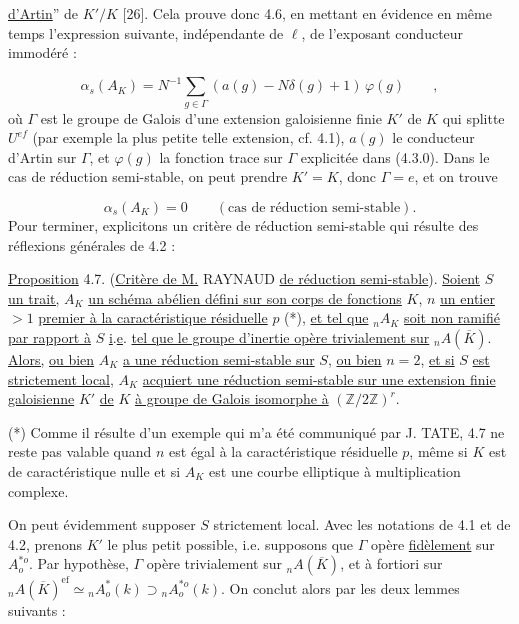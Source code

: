
\underline{d'Artin}'' de $K'/K$ [26]. Cela prouve donc 4.6, en mettant en évidence en même temps l'expression suivante, indépendante de $\ell$, de l'exposant conducteur immodéré :

\begin{equation}\tag{4.6.2}
\alpha_s(A_K) = N^{-1} \sum_{g \in \Gamma} (a(g)-N\delta(g)+1)\, \varphi(g) \qquad ,
\end{equation}
où $\Gamma$ est le groupe de Galois d'une extension galoisienne finie $K'$ de $K$ qui splitte $U^{ef}$ (par exemple la plus petite telle extension, cf. 4.1), $a(g)$ le conducteur d'Artin sur $\Gamma$, et $\varphi(g)$ la fonction trace sur $\Gamma$ explicitée dans (4.3.0). Dans le cas de réduction semi-stable, on peut prendre $K'=K$, donc $\Gamma = e$, et on trouve

\begin{equation}\tag{4.6.3}
\alpha_s(A_K) = 0 \qquad (\mbox{cas de réduction semi-stable}).
\end{equation}
Pour terminer, explicitons un critère de réduction semi-stable qui résulte des réflexions générales de 4.2 :

\underline{Proposition} 4.7. (\underline{Critère de M.} RAYNAUD \underline{de réduction semi-stable}). \underline{Soient} $S$ \underline{un trait,} $A_K$ \underline{un schéma abélien défini sur son corps de fonctions} $K$, $n$ \underline{un entier} $> 1$ \underline{premier à la caractéristique résiduelle} $p$ (*), \underline{et tel que} ${}_nA_K$ \underline{soit non ramifié par rapport à} $S$ \underline{i}.\underline{e}. \underline{tel que le groupe d'inertie opère trivialement sur} ${}_nA(\overline{K})$. \underline{Alors,} \underline{ou bien} $A_K$ \underline{a une réduction semi-stable sur} $S$, \underline{ou bien} $n = 2$, \underline{et si} $S$ \underline{est strictement local}, $A_K$ \underline{acquiert une réduction semi-stable sur une extension finie galoisienne} $K'$ \underline{de} $K$ \underline{à groupe de Galois isomorphe à} $(\mathbb{Z}/2\mathbb{Z})^r$.

(*) Comme il résulte d'un exemple qui m'a été communiqué par J. TATE, 4.7 ne reste pas valable quand $n$ est égal à la caractéristique résiduelle $p$, même si $K$ est de caractéristique nulle et si $A_K$ est une courbe elliptique à multiplication complexe.



On peut évidemment supposer $S$ strictement local. Avec les notations de 4.1 et de 4.2, prenons $K'$ le plus petit possible, i.e. supposons que $\Gamma$ opère \underline{fidèlement} sur $A^{*o}_o$. Par hypothèse, $\Gamma$ opère trivialement sur ${}_nA(\overline{K})$, et à fortiori sur ${}_nA(\overline{K})^{\mathrm{ef}} \simeq {}_nA^*_o(k) \supset {}_nA^{*o}_o(k)$. On conclut alors par les deux lemmes suivants :

